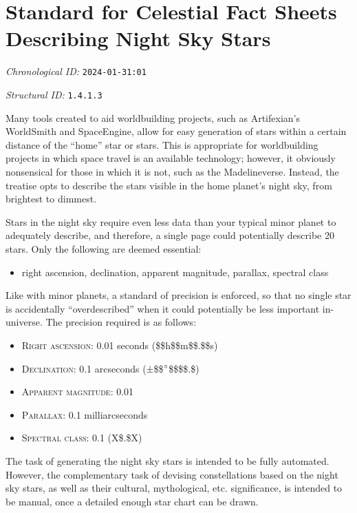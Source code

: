 \section{Standard for Celestial Fact Sheets Describing Night Sky Stars}
\emph{Chronological ID:} \texttt{2024-01-31:01}

\emph{Structural ID:} \texttt{1.4.1.3}

Many tools created to aid worldbuilding projects, such as Artifexian's WorldSmith and SpaceEngine, allow for easy generation of stars within a certain distance of the ``home'' star or stars. This is appropriate for worldbuilding projects in which space travel is an available technology; however, it obviously nonsensical for those in which it is not, such as the Madelineverse. Instead, the treatise opts to describe the stars visible in the home planet's night sky, from brightest to dimmest.

Stars in the night sky require even less data than your typical minor planet to adequately describe, and therefore, a single page could potentially describe 20 stars. Only the following are deemed essential:

\begin{itemize}
  \item right ascension, declination, apparent magnitude, parallax, spectral class
\end{itemize}

Like with minor planets, a standard of precision is enforced, so that no single star is accidentally ``overdescribed'' when it could potentially be less important in-universe. The precision required is as follows:

\begin{itemize}
  \item \textsc{Right ascension:} 0.01 seconds (\$\$h\$\$m\$\$.\$\$s)
  \item \textsc{Declination:} 0.1 arcseconds (±\$\$$\degree$\$\$\textquotesingle\$\$.\$\textquotesingle\textquotesingle)
  \item \textsc{Apparent magnitude:} 0.01
  \item \textsc{Parallax:} 0.1 milliarcseconds
  \item \textsc{Spectral class:} 0.1 (X\$.\$X)
\end{itemize}

The task of generating the night sky stars is intended to be fully automated. However, the complementary task of devising constellations based on the night sky stars, as well as their cultural, mythological, etc. significance, is intended to be manual, once a detailed enough star chart can be drawn.
\newpage
